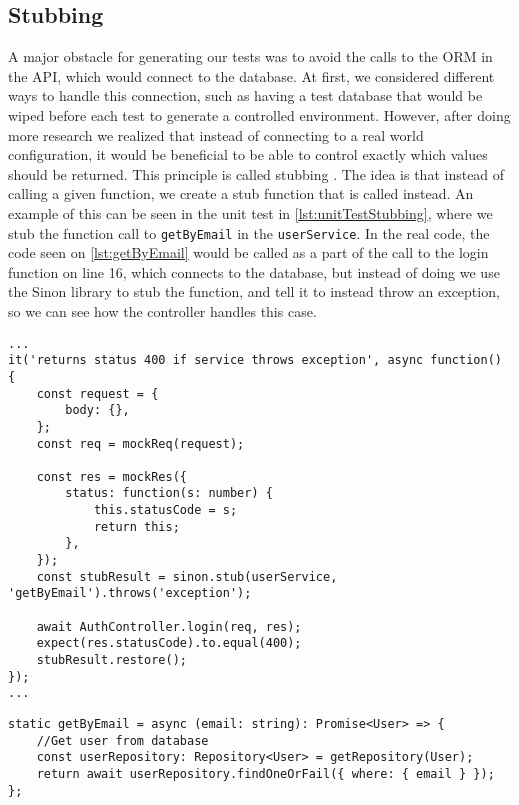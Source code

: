 \subsection{Stubbing}
A major obstacle for generating our tests was to avoid the calls to the ORM in the API, which would connect to the database.
At first, we considered different ways to handle this connection, such as having a test database that would be wiped before each test to generate a controlled environment.
However, after doing more research we realized that instead of connecting to a real world configuration, it would be beneficial to be able to control exactly which values should be returned.
This principle is called stubbing \cite{SoftwareTesting}.
The idea is that instead of calling a given function, we create a stub function that is called instead.
An example of this can be seen in the unit test in \autoref{lst:unitTestStubbing}, where we stub the function call to \texttt{getByEmail} in the \texttt{userService}.
In the real code, the code seen on \autoref{lst:getByEmail} would be called as a part of the call to the login function on line 16, which connects to the database, but instead of doing we use the Sinon library to stub the function, and tell it to instead throw an exception, so we can see how the controller handles this case.

\begin{lstlisting}[caption={Unit test with stubbing},label={lst:unitTestStubbing}]
...
it('returns status 400 if service throws exception', async function() {
    const request = {
        body: {},
    };
    const req = mockReq(request);

    const res = mockRes({
        status: function(s: number) {
            this.statusCode = s;
            return this;
        },
    });
    const stubResult = sinon.stub(userService, 'getByEmail').throws('exception');

    await AuthController.login(req, res);
    expect(res.statusCode).to.equal(400);
    stubResult.restore();
});
...
\end{lstlisting}

\begin{lstlisting}[caption={Actual getByEmail function},label={lst:getByEmail}]
static getByEmail = async (email: string): Promise<User> => {
    //Get user from database
    const userRepository: Repository<User> = getRepository(User);
    return await userRepository.findOneOrFail({ where: { email } });
};
\end{lstlisting}

